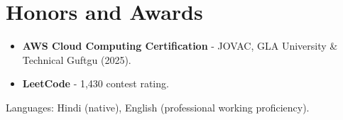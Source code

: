 \documentclass[11pt,a4paper,sans]{moderncv}
\begin{document}
\section{Honors and Awards}
\vspace{1pt}
\begin{itemize}
    \item {\textbf{AWS Cloud Computing Certification} - JOVAC, GLA University \& Technical Guftgu (2025).}
    \item {\textbf{LeetCode} - 1,430 contest rating.}
\end{itemize}


\vspace{2pt}
\small{Languages: Hindi (native), English (professional working proficiency).}
\end{document}
